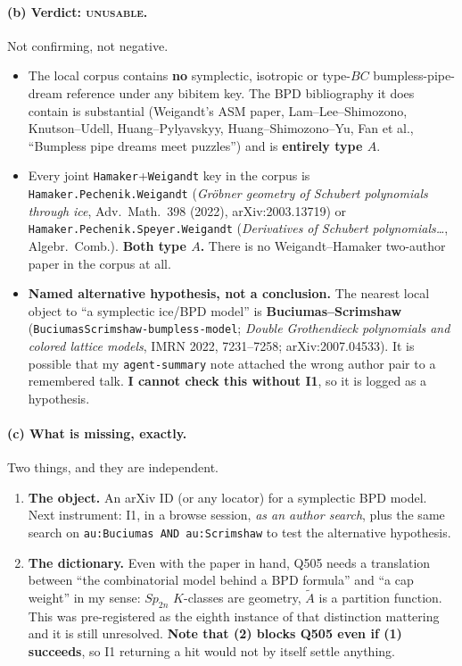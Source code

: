 \documentclass[11pt]{article}
\theoremstyle{definition}
\newcommand{\At}{\widetilde{A}}
\begin{document}
\paragraph{(b) Verdict: \textsc{unusable}.}  Not confirming, not negative.
\begin{itemize}
\item The local corpus contains \textbf{no} symplectic, isotropic or type-$BC$
  bumpless-pipe-dream reference under any bibitem key.  The BPD bibliography it
  does contain is substantial (Weigandt's ASM paper, Lam--Lee--Shimozono,
  Knutson--Udell, Huang--Pylyavskyy, Huang--Shimozono--Yu, Fan et al., ``Bumpless
  pipe dreams meet puzzles'') and is \textbf{entirely type $A$}.
\item Every joint \texttt{Hamaker}+\texttt{Weigandt} key in the corpus is
  \texttt{Hamaker.Pechenik.Weigandt} (\emph{Gröbner geometry of Schubert
  polynomials through ice}, Adv.\ Math.\ 398 (2022), arXiv:2003.13719) or
  \texttt{Hamaker.Pechenik.Speyer.Weigandt} (\emph{Derivatives of Schubert
  polynomials\ldots}, Algebr.\ Comb.).  \textbf{Both type $A$.}  There is no
  Weigandt--Hamaker two-author paper in the corpus at all.
\item \textbf{Named alternative hypothesis, not a conclusion.}  The nearest local
  object to ``a symplectic ice/BPD model'' is \textbf{Buciumas--Scrimshaw}
  (\texttt{BuciumasScrimshaw-bumpless-model}; \emph{Double Grothendieck
  polynomials and colored lattice models}, IMRN 2022, 7231--7258;
  arXiv:2007.04533).  It is possible that my \texttt{agent-summary} note
  attached the wrong author pair to a remembered talk.  \textbf{I cannot check
  this without I1}, so it is logged as a hypothesis.
\end{itemize}

\paragraph{(c) What is missing, exactly.}  Two things, and they are independent.
\begin{enumerate}
\item \textbf{The object.}  An arXiv ID (or any locator) for a symplectic BPD
  model.  Next instrument: I1, in a browse session, \emph{as an author search},
  plus the same search on \texttt{au:Buciumas AND au:Scrimshaw} to test the
  alternative hypothesis.
\item \textbf{The dictionary.}  Even with the paper in hand, Q505 needs a
  translation between ``the combinatorial model behind a BPD formula'' and ``a
  cap weight'' in my sense: $Sp_{2n}$ $K$-classes are geometry, $\At$ is a
  partition function.  This was pre-registered as the eighth instance of that
  distinction mattering and it is still unresolved.  \textbf{Note that (2) blocks
  Q505 even if (1) succeeds}, so I1 returning a hit would not by itself settle
  anything.
\end{enumerate}
\end{document}
